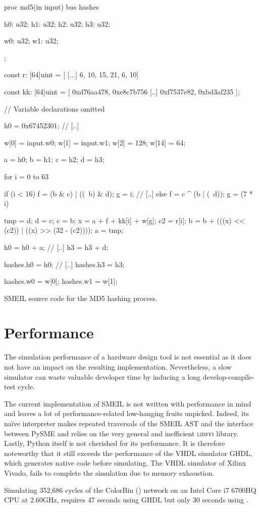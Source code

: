 \begin{widefigure}

\begin{smeilcode2}
proc md5(in input)
  bus hashes {
    h0: u32;
    h1: u32;
    h2: u32;
    h3: u32;

    w0: u32;
    w1: u32;
  };

  const r: [64]uint = [
    [...]
    6, 10, 15, 21, 6, 10]

  const kk: [64]uint = [
    0xd76aa478, 0xe8c7b756
    [..]
    0xf7537e82, 0xbd3af235
    ];

// Variable declarations omitted

{
  h0 = 0x67452301;
  // [..]

  w[0] = input.w0;
  w[1] = input.w1;
  w[2] = 128;
  w[14] = 64;

  a = h0;
  b = h1;
  c = h2;
  d = h3;

for i = 0 to 63 {
  if (i < 16) {
    f = (b & c) | ((~b) & d);
    g = i;
   // [..]
  } else {
    f = c ^ (b | (~d));
    g = (7 * i) %
  }

  tmp = d;
  d = c;
  c = b;
  x = a + f + kk[i] + w[g];
  c2 = r[i];
  b = b + (((x) << (c2)) |
      ((x) >> (32 - (c2))));
  a = tmp;
}

h0 = h0 + a;
// [..]
h3 = h3 + d;

hashes.h0 = h0;
// [..]
hashes.h3 = h3;

hashes.w0 = w[0];
hashes.w1 = w[1];
}

\end{smeilcode2}
  \caption{SMEIL source code for the MD5 hashing process.}
  \label{fig:smeilhash}

\end{widefigure}

\section{Performance}
The simulation performance of a hardware design tool is not essential as it does
not have an impact on the resulting implementation. Nevertheless, a slow
simulator can waste valuable developer time by inducing a long
develop-compile-test cycle.

The current implementation of SMEIL is not written with performance in mind and
leaves a lot of performance-related low-hanging fruits unpicked. Indeed, its
naïve interpreter makes repeated traversals of the SMEIL AST and the interface
between PySME and \libsme{} relies on the very general and inefficient
\textsc{libffi} library. Lastly, Python itself is not cherished for its
performance. It is therefore noteworthy that it still exceeds the performance of
the VHDL simulator GHDL, which generates native code before simulating. The VHDL
simulator of Xilinx Vivado, fails to complete the simulation due to memory
exhaustion.

Simulating 352,686 cycles of the ColorBin () network on an
Intel Core i7 6700HQ CPU at 2.60GHz, requires 47 seconds using GHDL but only 30
seconds using \libsme.


